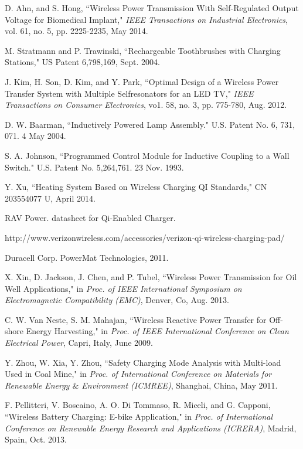 \documentclass[twocolumn,10pt]{IEEEtran}
\begin{document}
\begin{thebibliography}{99}
  D. Ahn, and S. Hong, ``Wireless Power Transmission With Self-Regulated Output Voltage for Biomedical Implant," 
\emph{IEEE Transactions on Industrial Electronics}, 
vol. 61, no. 5, pp. 2225-2235, May 2014.

 M. Stratmann and P. Trawinski, ``Rechargeable Toothbrushes with Charging Stations," US Patent 6,798,169, Sept. 2004. 

 J. Kim, H. Son, D. Kim, and Y. Park, ``Optimal Design of a Wireless Power Transfer System with Multiple Selfresonators
for an LED TV," \emph{IEEE Transactions on Consumer
Electronics}, vo1. 58, no. 3, pp. 775-780, Aug. 2012.

 D. W. Baarman, ``Inductively Powered Lamp Assembly." U.S. Patent No. 6, 731, 071. 4 May 2004.

 S. A. Johnson, ``Programmed Control Module for Inductive Coupling to a Wall Switch." U.S. Patent No. 5,264,761. 23 Nov. 1993.

 Y. Xu, ``Heating System Based on Wireless Charging QI Standards," CN 203554077 U, April 2014.

RAV Power. datasheet for Qi-Enabled Charger.

http://www.verizonwireless.com/accessories/verizon-qi-wireless-charging-pad/

Duracell Corp. PowerMat Technologies, 2011.

X. Xin, D. Jackson, J. Chen, and P. Tubel, ``Wireless Power Transmission for Oil Well Applications," in \emph{Proc. of IEEE International Symposium on Electromagnetic Compatibility (EMC)}, Denver, Co, Aug. 2013.

  C. W. Van Neste, S. M. Mahajan, ``Wireless Reactive Power Transfer for Off-shore Energy Harvesting," in \emph{Proc. of IEEE International Conference on Clean Electrical Power}, Capri, Italy, June 2009.

 Y. Zhou, W. Xia, Y. Zhou, ``Safety Charging Mode
Analysis with Multi-load Used in Coal Mine," in \emph{Proc. of International Conference on Materials for Renewable Energy $\&$ Environment (ICMREE)}, Shanghai, China, May 2011.

F. Pellitteri, V. Boscaino, A. O. Di Tommaso, R. Miceli, and G.
Capponi, ``Wireless Battery Charging: E-bike Application," in \emph{Proc. of International Conference on Renewable Energy Research and Applications (ICRERA)}, Madrid, Spain, Oct. 2013.


\end{thebibliography}
\end{document}
